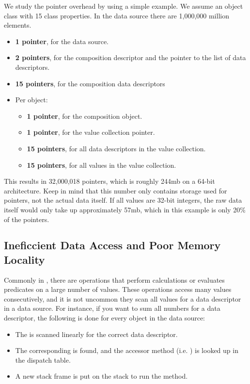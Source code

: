 We study the pointer overhead by using a simple example. We assume an object class with 15 class properties. In the data source there are 1,000,000 million elements.
\begin{itemize}
    \item \textbf{1 pointer}, for the data source.
    \item \textbf{2 pointers}, for the composition descriptor and the pointer to the list of data descriptors.
    \item \textbf{15 pointers}, for the composition data descriptors
    \item Per object:
    \begin{itemize}
        \item \textbf{1 pointer}, for the composition object.
        \item \textbf{1 pointer}, for the value collection pointer.
        \item \textbf{15 pointers}, for all data descriptors in the value collection.
        \item \textbf{15 pointers}, for all values in the value collection.
    \end{itemize}
\end{itemize}
This results in 32,000,018 pointers, which is roughly 244mb on a 64-bit architecture. Keep in mind that this number only contains storage used for pointers, not the actual data itself. If all values are 32-bit integers, the raw data itself would only take up approximately 57mb, which in this example is only 20\% of the pointers.

\subsection{Ineficcient Data Access and Poor Memory Locality}
\label{sub:Ineficcient Data Access and Poor Memory Locality}
Commonly in \gap, there are operations that perform calculations or evaluates predicates on a large number of values. These operations access many values consecutively, and it is not uncommon they scan all values for a data descriptor in a data source. For instance, if you want to sum all numbers for a data descriptor, the following is done for every object in the data source:

\begin{itemize}
    \item The  is scanned linearly for the correct data descriptor.
    \item The corresponding  is found, and the accessor method (i.e. ) is looked up in the dispatch table.
    \item A new stack frame is put on the stack to run the  method.
\end{itemize}

